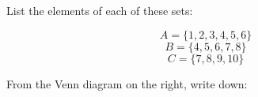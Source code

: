\documentclass[12pt, a4paper, addpoints]{exam}
\begin{document}
\begin{questions}
\begin{minipage}{0.5\textwidth}
\begin{center}
    \end{center}
\end{minipage}







\question List the elements of each of these sets:

\begin{minipage}{0.5\textwidth}
\end{minipage}
\begin{minipage}{0.5\textwidth}
    \[
    A = \{1, 2, 3, 4, 5, 6\}
    \]
    \[
    B = \{4, 5, 6, 7, 8\}
    \]
    \[
    C = \{7, 8, 9, 10\}
    \]
\end{minipage}


\question From the Venn diagram on the right, write down:

\begin{minipage}{0.5\textwidth}
    \begin{parts}

\end{parts}
\end{minipage}
\end{questions}
\end{document}
